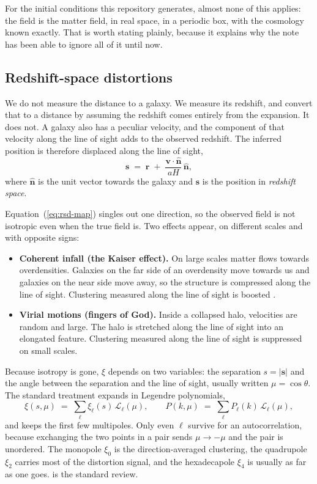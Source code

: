\documentclass[12pt]{article}
\newcommand{\bn}{\mathbf{n}}
\newcommand{\br}{\mathbf{r}}
\newcommand{\bs}{\mathbf{s}}
\newcommand{\bv}{\mathbf{v}}
\begin{document}
For the initial conditions this repository generates, almost none of this
applies: the field is the matter field, in real space, in a periodic box,
with the cosmology known exactly.  That is worth stating plainly, because
it explains why the note has been able to ignore all of it until now.

\subsection{Redshift-space distortions}
\label{sec:rsd}

We do not measure the distance to a galaxy.  We measure its redshift, and
convert that to a distance by assuming the redshift comes entirely from
the expansion.  It does not.  A galaxy also has a peculiar velocity, and
the component of that velocity along the line of sight adds to the
observed redshift.  The inferred position is therefore displaced along
the line of sight,
\begin{equation}
  \bs \;=\; \br \;+\; \frac{\bv\cdot\hat{\bn}}{a H}\,\hat{\bn},
  \label{eq:rsd-map}
\end{equation}
where $\hat{\bn}$ is the unit vector towards the galaxy and $\bs$ is the
position in \emph{redshift space}.

Equation~(\ref{eq:rsd-map}) singles out one direction, so the observed
field is not isotropic even when the true field is.  Two effects appear,
on different scales and with opposite signs:

\begin{itemize}
  \item \textbf{Coherent infall (the Kaiser effect).}  On large scales
        matter flows towards overdensities.  Galaxies on the far side of
        an overdensity move towards us and galaxies on the near side move
        away, so the structure is compressed along the line of sight.
        Clustering measured along the line of sight is boosted
        \citep{Kaiser1987}.
  \item \textbf{Virial motions (fingers of God).}  Inside a collapsed
        halo, velocities are random and large.  The halo is stretched
        along the line of sight into an elongated feature.  Clustering
        measured along the line of sight is suppressed on small scales.
\end{itemize}

Because isotropy is gone, $\xi$ depends on two variables: the separation
$s = |\bs|$ and the angle between the separation and the line of sight,
usually written $\mu = \cos\theta$.  The standard treatment expands in
Legendre polynomials,
\begin{equation}
  \xi(s,\mu) \;=\; \sum_{\ell} \xi_\ell(s)\,\mathcal L_\ell(\mu),
  \qquad
  P(k,\mu) \;=\; \sum_{\ell} P_\ell(k)\,\mathcal L_\ell(\mu),
  \label{eq:multipoles}
\end{equation}
and keeps the first few multipoles.  Only even $\ell$ survive for an
autocorrelation, because exchanging the two points in a pair sends
$\mu \to -\mu$ and the pair is unordered.  The monopole $\xi_0$ is the
direction-averaged clustering, the quadrupole $\xi_2$ carries most of the
distortion signal, and the hexadecapole $\xi_4$ is usually as far as one
goes.  \citet{Hamilton1998} is the standard review.
\end{document}
